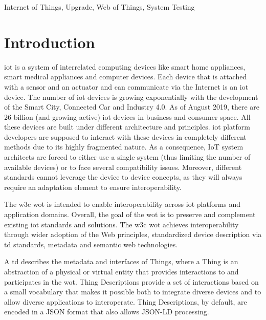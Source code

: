 \documentclass[conference]{IEEEtran}
\theoremstyle{definition}
\begin{document}
\begin{IEEEkeywords}
Internet of Things, Upgrade, Web of Things, System Testing
\end{IEEEkeywords}

\section{Introduction} \label{introduction}

\ac{iot} is a system of interrelated computing devices like smart home appliances, smart medical appliances and computer devices. 
Each device that is attached with a sensor and an actuator and can communicate via the Internet is an \ac{iot} device. 
The number of \ac{iot} devices is growing exponentially with the development of the Smart City, Connected Car and Industry 4.0. 
As of August 2019, there are 26 billion (and growing active) \ac{iot} devices in business and consumer space.
All these devices are built under different architecture and principles. 
\ac{iot} platform developers are supposed to interact with these devices in completely different methods due to its highly fragmented nature.  
As a consequence, IoT system architects are forced to either use a single system (thus limiting the number of available devices) or to face several compatibility issues. 
Moreover, different standards cannot leverage the device to device concepts, as they will always require an adaptation element to ensure interoperability. \cite{fantacci2014short}


The \ac{w3c} \ac{wot} is intended to enable interoperability across \ac{iot} platforms and application domains. 
Overall, the goal of the \ac{wot} is to preserve and complement existing \ac{iot} standards and solutions. 
The \ac{w3c} \ac{wot} achieves interoperability through wider adoption of the Web principles, standardized device description via \ac{td} standards, metadata and semantic web technologies. 

A \ac{td} describes the metadata and interfaces of Things, where a Thing is an abstraction of a physical or virtual entity that provides interactions to and participates in the \ac{wot}. 
Thing Descriptions provide a set of interactions based on a small vocabulary that makes it possible both to integrate diverse devices and to allow diverse applications to interoperate. 
Thing Descriptions, by default, are encoded in a JSON format that also allows JSON-LD processing. 
\end{document}
